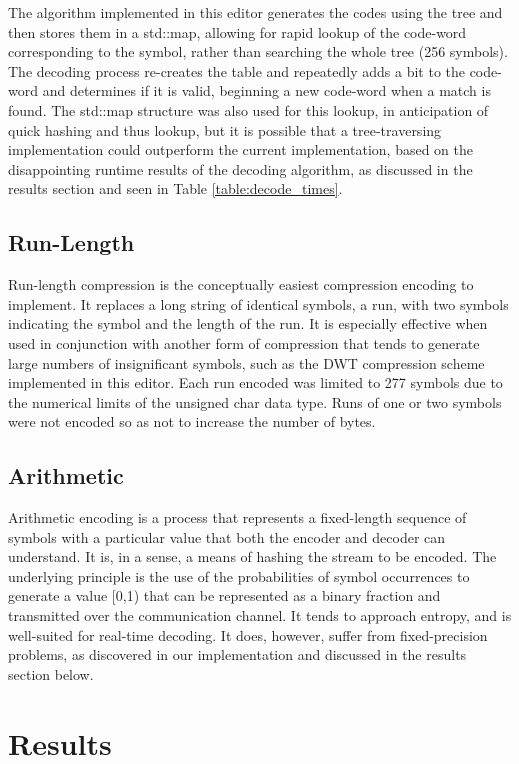 \documentclass[10pt,twocolumn,twoside]{IEEEtran}
\begin{document}
The algorithm implemented in this editor generates the codes using the tree and then stores them in a std::map, allowing for rapid lookup of the code-word corresponding to the symbol, rather than searching the whole tree (256 symbols). The decoding process re-creates the table and repeatedly adds a bit to the code-word and determines if it is valid, beginning a new code-word when a match is found. The std::map structure was also used for this lookup, in anticipation of quick hashing and thus lookup, but it is possible that a tree-traversing implementation could outperform the current implementation, based on the disappointing runtime results of the decoding algorithm, as discussed in the results section and seen in Table \ref{table:decode_times}.

\subsection{Run-Length}
Run-length compression is the conceptually easiest compression encoding to implement. It replaces a long string of identical symbols, a run, with two symbols indicating the symbol and the length of the run. It is especially effective when used in conjunction with another form of compression that tends to generate large numbers of insignificant symbols, such as the DWT compression scheme implemented in this editor. Each run encoded was limited to 277 symbols due to the numerical limits of the unsigned char data type. Runs of one or two symbols were not encoded so as not to increase the number of bytes.

\subsection{Arithmetic}
Arithmetic encoding is a process that represents a fixed-length sequence of symbols with a particular value that both the encoder and decoder can understand. It is, in a sense, a means of hashing the stream to be encoded. The underlying principle is the use of the probabilities of symbol occurrences to generate a value [0,1) that can be represented as a binary fraction and transmitted over the communication channel. It tends to approach entropy, and is well-suited for real-time decoding. It does, however, suffer from fixed-precision problems, as discovered in our implementation and discussed in the results section below.

\section{Results}
\end{document}
